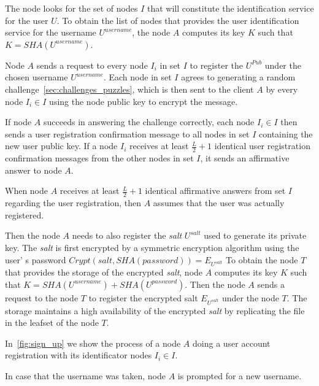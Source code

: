 The node  looks for the set of nodes $I$ that will constitute the
identification service for the user $U$. To obtain the list of nodes that provides the user identification service for
the username $U^{username}$, the node $A$ computes its key $K$ such that $K =
SHA(U^{username})$. 

Node $A$ sends a request to every node $I_i$ in set $I$ to register the
$U^{Pub}$ under the chosen  username  $U^{username}$.
Each node in set $I$ agrees to generating a random challenge~\ref{sec:challenges_puzzles}, which is then sent to the
client $A$ by every node $I_i \in I$ using the node public key to encrypt the
message.

If node $A$ succeeds in answering the challenge correctly, each node $I_i \in I$ then sends a user registration confirmation message to all nodes
in set $I$ containing the new user public key. If a node $I_i$ receives at
least $\frac{L}{2} + 1$ identical user registration confirmation messages from
the other nodes in set $I$, it sends an affirmative answer to node $A$.

When node $A$ receives at least $\frac{L}{2} + 1$ identical affirmative answers
from set $I$ regarding the user registration, then $A$ assumes that the user was
actually registered.

Then the node $A$ needs to also register the \textit{salt} $U^{salt}$ used to
generate its private key. The \textit{salt} is first encrypted by a symmetric encryption algorithm
using the user' s password $Crypt(salt, SHA(password)) = E_{U^{salt}}$
To obtain the node $T$ that provides the storage of the encrypted \textit{salt},
node $A$ computes its key $K$ such that $K = SHA(U^{username})+SHA(U^{password})$.
Then the node $A$ sends a request to the node $T$ to register the
encrypted salt $E_{U^{salt}}$ under the node $T$.
The storage maintains a high availability of the encrypted \textit{salt} by
replicating the file in the leafset of the node $T$.


In~\ref{fig:sign_up} we show the process of a node $A$ doing a user account
registration with its identificator nodes $I_i \in I$.

In case that the username was taken,
node $A$ is prompted for a new username.



